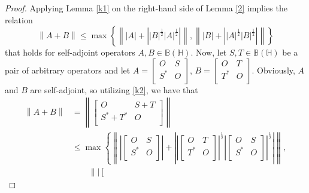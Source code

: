\documentclass[10pt,a4paper]{amsart}
\begin{document}
\begin{proof}
Applying Lemma \ref{k1} on the right-hand side of Lemma \ref{2} implies the relation
\begin{equation}\label{k2}
\left\| A+B \right\|\le \max \left\{ \left\| \left| A \right|+\left| {{\left| B \right|}^{\frac{1}{2}}}{{\left| A \right|}^{\frac{1}{2}}} \right| \right\|,\left\| \left| B \right|+\left| {{\left| A \right|}^{\frac{1}{2}}}{{\left| B \right|}^{\frac{1}{2}}} \right| \right\| \right\}
\end{equation}
that holds for self-adjoint operators  $A,B\in \mathbb B\left( \mathbb H \right)$.
Now, let $S,T\in \mathbb B\left( \mathbb H \right)$ be a pair of arbitrary operators and let $A=\left[ \begin{matrix}
   O & S  \\
   {{S}^{*}} & O  \\
\end{matrix} \right]$, $B=\left[ \begin{matrix}
   O & T  \\
   {{T}^{*}} & O  \\
\end{matrix} \right]$.
Obviously, $A$ and $B$ are self-adjoint, so utilizing \eqref{k2}, we have that
\[\begin{aligned}
   \left\| A+B \right\|&=\left\| \left[ \begin{matrix}
   O & S+T  \\
   {{S}^{*}}+{{T}^{*}} & O  \\
\end{matrix} \right] \right\| \\
 & \le \max \left\{ \left\| \left| \left[ \begin{matrix}
   O & S  \\
   {{S}^{*}} & O  \\
\end{matrix} \right] \right|+\left| {{\left| \left[ \begin{matrix}
   O & T  \\
   {{T}^{*}} & O  \\
\end{matrix} \right] \right|}^{\frac{1}{2}}}{{\left| \left[ \begin{matrix}
   O & S  \\
   {{S}^{*}} & O  \\
\end{matrix} \right] \right|}^{\frac{1}{2}}} \right| \right\|,\right. \\
 &\qquad \left. \left\| \left| \left[ \begin{matrix}

\end{matrix}
\end{aligned}\]
\end{proof}
\end{document}
